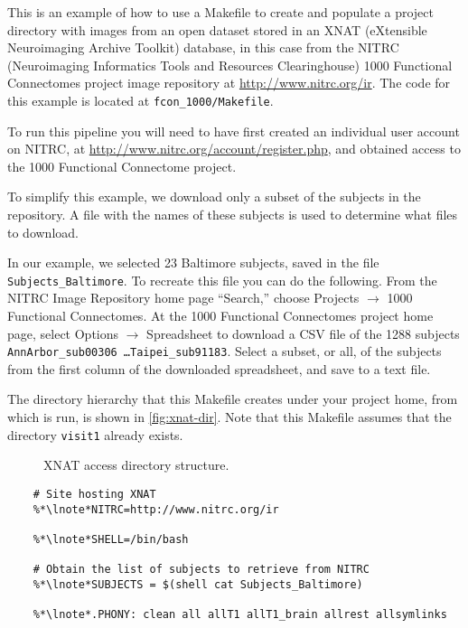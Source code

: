 \label{chap:XNAT}

This is an example of how to use a Makefile to create and populate a
project directory with images from an open dataset stored in an XNAT
(eXtensible Neuroimaging Archive Toolkit) database, in this case from
the NITRC (Neuroimaging Informatics Tools and Resources Clearinghouse)
1000 Functional Connectomes project image repository at
\url{http://www.nitrc.org/ir}. The code for this example is located at \texttt{fcon_1000/Makefile}.

To run this pipeline you will need to have first created an individual
user account on NITRC, at
\url{http://www.nitrc.org/account/register.php}, and obtained access
to the 1000 Functional Connectome project.

To simplify this example, we download only a subset of the subjects in
the repository. A file with the names of these subjects is used to
determine what files to download.

In our example, we selected 23 Baltimore subjects, saved in the file \texttt{Subjects_Baltimore}.
To recreate this file you can do the following. From the NITRC Image Repository home page ``Search,'' choose Projects $\rightarrow$ 1000 Functional Connectomes. At the 1000 Functional Connectomes project home page, select Options $\rightarrow$ Spreadsheet to download a CSV file of the 1288 subjects \texttt{AnnArbor_sub00306 \ldots Taipei_sub91183}. Select a subset, or all, of the subjects from the first column of the downloaded spreadsheet, and save to a text file. 

The directory hierarchy that this Makefile creates under your project home, from which \maken{} is run, is shown in \autoref{fig:xnat-dir}. Note
that this Makefile assumes that the directory \texttt{visit1} already exists.

\begin{figure}
		\caption{XNAT access directory structure.}
			\label{fig:xnat-dir}
\end{figure}


\begin{lstlisting}
	# Site hosting XNAT
	%*\lnote*NITRC=http://www.nitrc.org/ir
	
	%*\lnote*SHELL=/bin/bash
	
	# Obtain the list of subjects to retrieve from NITRC
	%*\lnote*SUBJECTS = $(shell cat Subjects_Baltimore)

	%*\lnote*.PHONY: clean all allT1 allT1_brain allrest allsymlinks
\end{lstlisting}

